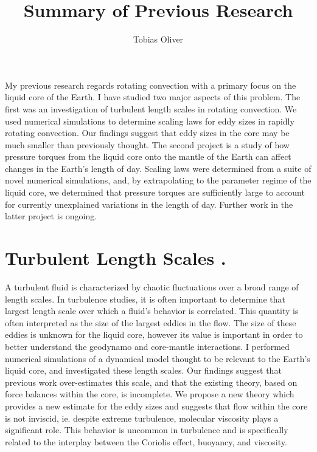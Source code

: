 \documentclass{article}
\title{Summary of Previous Research}
\author{Tobias Oliver}
\date{}
\begin{document}
\maketitle
My previous research regards rotating convection with a primary focus on the liquid core of the Earth. I have studied two major aspects of this problem. The first was an investigation of turbulent length scales in rotating convection. We used numerical simulations to determine scaling laws for eddy sizes in rapidly rotating convection. Our findings suggest that eddy sizes in the core may be much smaller than previously thought. The second project is a study of how pressure torques from the liquid core onto the mantle of the Earth can affect changes in the Earth's length of day. Scaling laws were determined from a suite of novel numerical simulations, and, by extrapolating to the parameter regime of the liquid core, we determined that pressure torques are sufficiently large to account for currently unexplained variations in the length of day. Further work in the latter project is ongoing.
\section{Turbulent Length Scales \cite{tO23}.}
A turbulent fluid is characterized by chaotic fluctuations over a broad range of length scales. In turbulence studies, it is often important to determine that largest length scale over which a fluid's behavior is correlated. This quantity is often interpreted as the size of the largest eddies in the flow.
The size of these eddies is unknown for the liquid core, however its value is important in order to better understand the geodynamo and core-mantle interactions. I performed numerical simulations of a dynamical model thought to be relevant to the Earth's liquid core, and investigated these length scales. Our findings suggest that previous work over-estimates this scale, and that the existing theory, based on force balances within the core, is incomplete. We propose a new theory which provides a new estimate for the eddy sizes and suggests that flow within the core is not inviscid, ie. despite extreme turbulence, molecular viscosity plays a significant role. This behavior is uncommon in turbulence and is specifically related to the interplay between the Coriolis effect, buoyancy, and viscosity.
\end{document}
